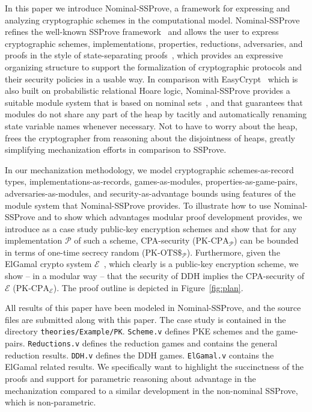 \documentclass[a4paper,USenglish,cleveref, autoref]{lipics-v2021}
\renewcommand{\P}{\mathcal{P}}
\newcommand{\CPA}{\ensuremath{\mathrm{PK\text{-}CPA}}}
\newcommand{\OTSR}{\ensuremath{\mathrm{PK\text{-}OTS\$}}}
\newcommand{\NSSP}{Nominal-SSProve\xspace}
\begin{document}
In this paper we introduce \NSSP, a framework for expressing and analyzing cryptographic schemes in the computational model. \NSSP refines the well-known SSProve framework~\cite{haselwarter23popl}  and allows the user to express cryptographic schemes, implementations, properties, reductions, adversaries, and proofs in the style of state-separating proofs~\cite{brzuska18asiacrypt}, which provides an expressive organizing structure to support the formalization of cryptographic protocols and their security policies in a usable way. In comparison with EasyCrypt~\cite{barthe11,dupressoir22csf} which is also built on probabilistic relational Hoare logic, \NSSP provides a suitable module system that is based on nominal sets~\cite{gabbay01fac,pitts11}, and that guarantees that modules do not share any part of the heap by tacitly and automatically renaming state variable names whenever necessary.  Not to have to worry about the heap, frees the cryptographer from reasoning about the disjointness of heaps, greatly simplifying mechanization efforts in comparison to SSProve.

In our mechanization methodology, we model cryptographic schemes-as-record types,  implementations-as-records, games-as-modules, properties-as-game-pairs, adversaries-as-modules, and security-as-advantage bounds using features of the module system that \NSSP provides. To illustrate how to use \NSSP and to show which advantages  modular proof development provides, we introduce as a case study  public-key encryption schemes and show that for any implementation $\P$ of such a scheme, CPA-security (\CPA$_\P$) can be bounded in terms of one-time secrecy random (\OTSR$_\P$).
Furthermore, given the ElGamal crypto system $\mathcal{E}$~\cite{elgamal}, which clearly is a public-key encryption scheme, we show -- in a modular way -- that the security of DDH implies the CPA-security of $\mathcal{E}$ (\CPA$_\mathcal{E}$). The proof outline is depicted in Figure~\ref{fig:plan}.


All results of this paper have been modeled in \NSSP, and the source files are submitted along with this paper.
The case study is contained in the directory \texttt{theories/Example/PK}.
\texttt{Scheme.v} defines PKE schemes and the game-pairs.
\texttt{Reductions.v} defines the reduction games and contains the general reduction results.
\texttt{DDH.v} defines the DDH games.
\texttt{ElGamal.v} contains the ElGamal related results.
We specifically want to highlight the succinctness of the proofs and support for parametric reasoning about advantage in the mechanization compared to a similar development in the non-nominal SSProve, which is non-parametric.
\end{document}
